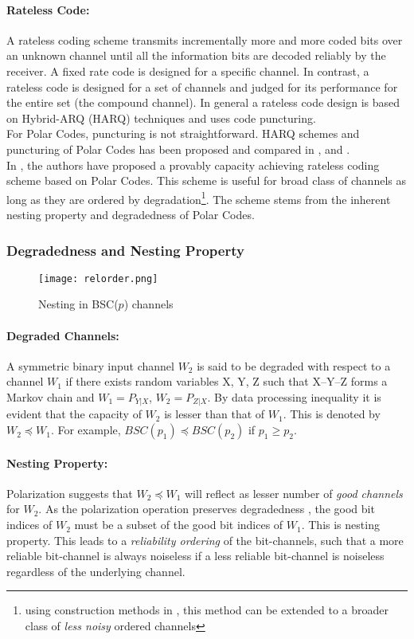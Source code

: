 \documentclass[
11pt, %
a4paper, %
oneside, %
headinclude,footinclude, %
BCOR5mm, %
]{scrartcl}
\begin{document}
\paragraph{Rateless Code:}A rateless coding scheme transmits incrementally more and more coded bits over an unknown channel until all the information bits are decoded reliably by the receiver. A fixed rate code is designed for a specific channel. In contrast, a rateless code is designed for a set of channels and judged for its performance for the entire set (the compound channel). In general a rateless code design is based on Hybrid-ARQ (HARQ) techniques and uses code puncturing. \\For Polar Codes, puncturing is not straightforward. HARQ schemes and puncturing of Polar Codes has been proposed and compared in \cite{harqtav}, \cite{harqcheng} and \cite{harqchen}.\\ In \cite{chen}, the authors have proposed a provably capacity achieving rateless coding scheme based on Polar Codes. This scheme is useful for broad class of channels as long as they are ordered by degradation\footnote{using construction methods in \cite{wang}, \cite{mondelli} this method can be extended to a broader class of \emph{less noisy} ordered channels}. The scheme stems from the inherent nesting property and degradedness of Polar Codes.

\subsubsection{Degradedness and Nesting Property}
\begin{wrapfigure}{r}{0.5\textwidth}
  \begin{center}
    \texttt{[image: relorder.png]}
  \end{center}
  \caption{Nesting in BSC($p$) channels}
  \label{fig:relorder}
\end{wrapfigure}
\paragraph{Degraded Channels:}A symmetric binary input channel $W_2$ is said to be degraded with respect to a channel $W_1$ if there exists random variables X, Y, Z such that X\---Y\---Z forms a Markov chain and $W_1=P_{Y|X}$, $W_2=P_{Z|X}$. By data processing inequality it is evident that the capacity of $W_2$ is lesser than that of $W_1$. This is denoted by $W_2 \preceq W_1$. For example, $BSC(p_1) \preceq BSC(p_2)$ if $p_1 \geq p_2$.
\paragraph{Nesting Property:}Polarization suggests that $W_2 \preceq W_1$ will reflect as lesser number of \emph{good channels} for $W_2$. As the polarization operation preserves degradedness \cite{wang}, the good bit indices of $W_2$ must be a subset of the good bit indices of $W_1$. This is nesting property. 
\clearpage
This leads to a \emph{reliability ordering} of the bit-channels, such that a more reliable bit-channel is always noiseless if a less reliable bit-channel is noiseless regardless of the underlying channel.
\end{document}
